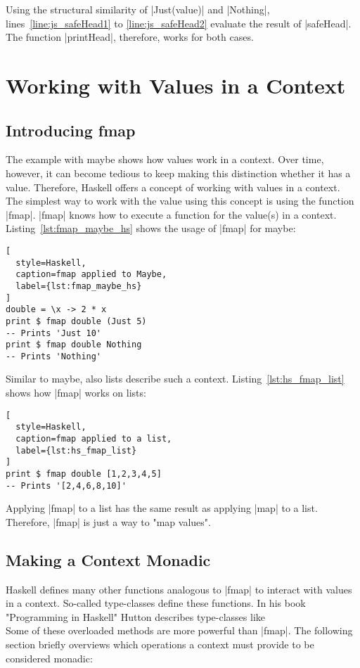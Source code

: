 Using the structural similarity of |Just(value)| and |Nothing|,
lines~\ref{line:js_safeHead1} to \ref{line:js_safeHead2} evaluate the result of
|safeHead|. The function |printHead|, therefore, works for both cases.

\section{Working with Values in a Context} %
\label{sec:Working with values in a context}
\subsection{Introducing fmap} %
\label{sub:Introducing fmap}
The example with maybe shows how values work in a context. Over time,
however, it can become tedious to keep making this distinction whether
it has a value. Therefore, Haskell offers a concept of working with values in a
context. The simplest way to work with the value using this concept is using
the function |fmap|. |fmap| knows how to execute a function for the value(s) in
a context. Listing~\ref{lst:fmap_maybe_hs} shows the usage of |fmap| for
maybe:

\begin{lstlisting}[
  style=Haskell,
  caption=fmap applied to Maybe,
  label={lst:fmap_maybe_hs}
]
double = \x -> 2 * x
print $ fmap double (Just 5)
-- Prints 'Just 10' 
print $ fmap double Nothing
-- Prints 'Nothing'
\end{lstlisting}

Similar to maybe, also lists describe such a context.
Listing~\ref{lst:hs_fmap_list} shows how |fmap| works on lists:

\begin{lstlisting}[
  style=Haskell,
  caption=fmap applied to a list,
  label={lst:hs_fmap_list}
]
print $ fmap double [1,2,3,4,5]
-- Prints '[2,4,6,8,10]'
\end{lstlisting}

Applying |fmap| to a list has the same result as applying |map| to a list.
Therefore, |fmap| is just a way to "map values".

\subsection{Making a Context Monadic} %
\label{sub:Making a Context Monadic}
Haskell defines many other functions analogous to |fmap| to interact with
values in a context. So-called type-classes define these functions. In his book
"Programming in Haskell" Hutton describes type-classes like
\\ 
Some of these overloaded methods are more powerful than |fmap|. The following
section briefly overviews which operations a context must provide to be
considered monadic:

